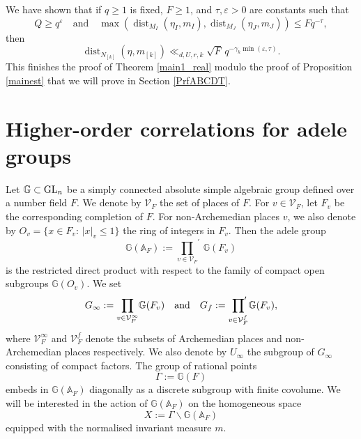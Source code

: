 \documentclass[11pt,reqno,a4paper]{amsart}
\numberwithin{equation}{section}
\newcommand{\bA}{\mathbb{A}}
\newcommand{\bG}{\mathbb{G}}
\newcommand{\qand}{\quad \textrm{and} \quad}
\newcommand{\eps}{\varepsilon}
\DeclareMathOperator{\dist}{dist}
\theoremstyle{theorem}
\theoremstyle{definition}
\begin{document}
 We have shown that if $q \geq 1$ is fixed, $F\ge 1$, and $\tau, \eps > 0$ are constants such that
\[
Q \geq q^\eps  \qand \max(\dist_{M_I}(\eta_I,m_I),\dist_{M_J}(\eta_J,m_J)) \leq F q^{-\tau},
\]
then 
$$
\dist_{N_{[k]}}(\eta,m_{[k]}) \ll_{d,U,r,k} \sqrt{F}\,q^{-\gamma_k \min(\eps,\tau)}.
$$
 This finishes the proof of Theorem \ref{main1_real} modulo the proof of Proposition \ref{mainest} that we will prove in Section \ref{PrfABCDT}.



\section{Higher-order correlations for adele groups}
\label{outline_main1_adele}

Let $\bG\subset \hbox{GL}_n$ be a simply connected absolute simple algebraic group defined over a number field $F$. We denote by $\mathcal{V}_F$ the set of places of $F$. 
For $v\in \mathcal{V}_F$, let $F_v$ be the corresponding completion of $F$. 
For non-Archemedian places $v$, we also denote by $O_v=\{x\in F_v:\, |x|_v\le 1\}$
the ring of integers in $F_v$. Then the adele group
$$
\bG(\bA_F):={\prod_{v\in\mathcal{V}_F}}^{\!\!\!\prime}\, \bG(F_v)
$$
is the restricted direct product with respect to the family of compact open subgroups $\bG(O_v)$. We set
$$
G_\infty:={\prod_{v\in\mathcal{V}^\infty_F}} \bG(F_v)
\quad \hbox{and}\quad 
G_f:={\prod_{v\in\mathcal{V}^f_F}}^{\!\!\!\prime} \,\bG(F_v),
$$
where $\mathcal{V}^\infty_F$ and $\mathcal{V}^f_F$ denote the subsets of Archemedian places
and non-Archemedian places respectively.
We also denote by $U_\infty$ the subgroup of $G_\infty$ consisting of compact factors.
The group  of rational points 
$$
\Gamma:=\bG(F)
$$
embeds in $\bG(\bA_F)$ diagonally as a discrete subgroup with finite covolume.
We will be interested in the action of $\bG(\bA_F)$ on the homogeneous space
$$
X:=\Gamma\backslash \bG(\bA_F)
$$
equipped with the normalised invariant measure $m$.
\end{document}
